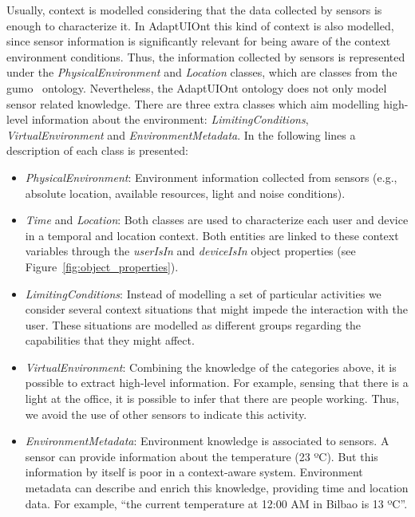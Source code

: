 Usually, context is modelled considering that the data collected by sensors is
enough to characterize it. In AdaptUIOnt this kind of context is also modelled,
since sensor information is significantly relevant for being aware of the context
environment conditions. Thus, the information collected by sensors is represented
under the \textit{PhysicalEnvironment} and \textit{Location} classes, which are
classes from the \ac{gumo}~\citep{heckmann_gumogeneral_2005} ontology. Nevertheless,
the AdaptUIOnt ontology does not only model sensor related knowledge. There are
three extra classes which aim modelling high-level information about the
environment: \textit{LimitingConditions}, \textit{VirtualEnvironment} and
\textit{EnvironmentMetadata}. In the following lines a description of each class
is presented:

\begin{itemize}
 \item \textit{PhysicalEnvironment}: Environment information collected from
 sensors (e.g., absolute location, available resources, light and noise conditions).
 
 \item \textit{Time} and \textit{Location}: Both classes are used to characterize
 each user and device in a temporal and location context. Both entities are linked
 to these context variables through the \textit{userIsIn} and \textit{deviceIsIn}
 object properties (see Figure~\ref{fig:object_properties}).
 
 \item \textit{LimitingConditions}: Instead of modelling a set of particular
 activities we consider several context situations that might impede the interaction
 with the user. These situations are modelled as different groups regarding the
 capabilities that they might affect.
 
 \item \textit{VirtualEnvironment}: Combining the knowledge of the categories
 above, it is possible to extract high-level information. For example, sensing
 that there is a light at the office, it is possible to infer that there are
 people working. Thus, we avoid the use of other sensors to indicate this
 activity.
 
 \item \textit{EnvironmentMetadata}: Environment knowledge is associated to
 sensors. A sensor can provide information about the temperature (23 ºC). But
 this information by itself is poor in a context-aware system. Environment metadata
 can describe and enrich this knowledge, providing time and location data. For
 example, ``the current temperature at 12:00 AM in Bilbao is 13 ºC''.
\end{itemize}


